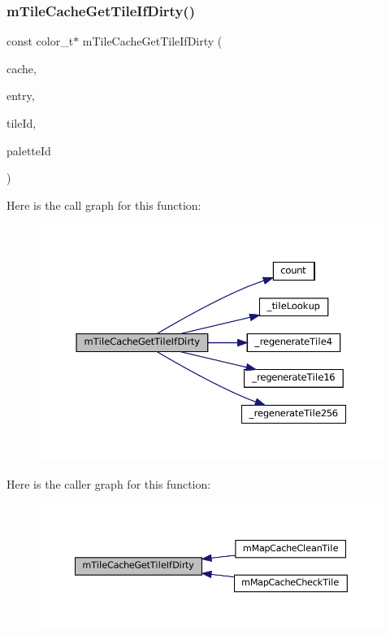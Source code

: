 \subsubsection{\texorpdfstring{m\+Tile\+Cache\+Get\+Tile\+If\+Dirty()}{mTileCacheGetTileIfDirty()}}
{\footnotesize\ttfamily const color\+\_\+t$\ast$ m\+Tile\+Cache\+Get\+Tile\+If\+Dirty (\begin{DoxyParamCaption}\item[{struct m\+Tile\+Cache $\ast$}]{cache,  }\item[{struct m\+Tile\+Cache\+Entry $\ast$}]{entry,  }\item[{unsigned}]{tile\+Id,  }\item[{unsigned}]{palette\+Id }\end{DoxyParamCaption})}

Here is the call graph for this function\+:
\nopagebreak
\begin{figure}[H]
\begin{center}
\leavevmode
\includegraphics[width=350pt]{tile-cache_8c_ac03a3bf273a14e0a825221dce2343a9d_cgraph}
\end{center}
\end{figure}
Here is the caller graph for this function\+:
\nopagebreak
\begin{figure}[H]
\begin{center}
\leavevmode
\includegraphics[width=350pt]{tile-cache_8c_ac03a3bf273a14e0a825221dce2343a9d_icgraph}
\end{center}
\end{figure}
\mbox{\label{tile-cache_8c_a5bf34d1c79ff5b95ad75b72e5082856d}} 
